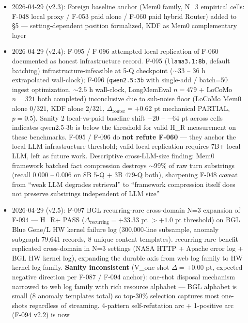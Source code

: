 \begin{itemize}
  benefit: recurring rare structure \$\times {} \times \$
  web access log family + HW kernel log family
\item
  2026-04-29 (v2.3): Foreign baseline anchor (Mem0 family, N=3 empirical
  cells: F-048 local proxy / F-053 paid alone / F-060 paid hybrid Router)
  added to §5 --- setting-dependent position formalized, KDF as Mem0
  complementary layer
\item
  2026-04-29 (v2.4): F-095 / F-096 attempted local replication of F-060
  documented as honest infrastructure record. F-095 (\texttt{llama3.1:8b},
  default batching) infrastructure-infeasible at 5-Q checkpoint
  (\(\sim 33\) -- \(36\) h extrapolated wall-clock); F-096 (\texttt{qwen2.5:3b}
  with single-add / batch=50 ingest optimization, \(\sim 2.5\) h
  wall-clock, LongMemEval \(n=479\) + LoCoMo \(n=321\) both completed)
  inconclusive due to sub-noise floor (LoCoMo Mem0 alone \(0/321\), KDF
  alone \(2/321\), \(\Delta_{\text{router}} = +0.62\) pt mechanical PARTIAL,
  \(p = 0.5\)). Sanity 2 local-vs-paid baseline shift \(-20\) -- \(-64\) pt
  across cells indicates qwen2.5-3b is below the threshold for valid
  H\_R measurement on these benchmarks. F-095 / F-096 do \textbf{not refute
  F-060} --- they anchor the local-LLM infrastructure threshold; valid
  local replication requires \(7\)B+ local LLM, left as future work.
  Descriptive cross-LLM-size finding: Mem0 framework batched fact
  compression destroys \(\sim 99\%\) of raw turn substrings (recall
  \(0.000\) -- \(0.006\) on 8B 5-Q + 3B 479-Q both), sharpening F-048
  caveat from ``weak LLM degrades retrieval'' to ``framework compression
  itself does not preserve substrings independent of LLM size''
\item
  2026-04-29 (v2.5): F-097 BGL recurring-rare cross-domain N=3 expansion
  of F-094 --- H\_R+ PASS (\(\Delta_{\text{recurring}} = +33.33\) pt
  \(> +1.0\) pt threshold) on BGL Blue Gene/L HW kernel failure log
  (300,000-line subsample, anomaly subgraph 79,641 records, 8 unique
  content templates). recurring-rare benefit replicated cross-domain
  in N=3 settings (NASA HTTP + Apache error log + BGL HW kernel log),
  expanding the durable axis from web log family to HW kernel log
  family. \textbf{Sanity inconsistent} (V\_one-shot \(\Delta = +0.00\) pt,
  expected negative direction per F-087 / F-094 anchor): one-shot
  disposal mechanism narrowed to web log family with rich resource
  alphabet --- BGL alphabet is small (8 anomaly templates total) so
  top-30\% selection captures most one-shots regardless of streaming.
  4-pattern self-refutation arc + 1-positive arc (F-094 v2.2) is now

\end{itemize}
